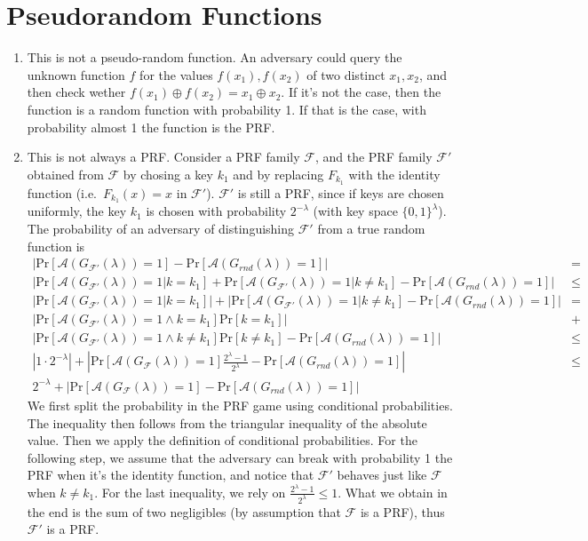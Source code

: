 \documentclass{article}
\newcommand{\adversary}{\mathcal{A}}
\newcommand{\prf}{\mathcal{F}}
\newcommand{\xor}{\oplus}
\renewcommand{\Pr}[1]{\ensuremath{\mathrm{Pr} \left[ {#1} \right]}}
\newcommand{\abs}[1]{\left| {#1} \right|}
\begin{document}
\section{Pseudorandom Functions}

\begin{enumerate}
	\item This is not a pseudo-random function.
		An adversary could query the unknown function $f$ for the values $f(x_1), f(x_2)$ of two distinct $x_1, x_2$, and then check wether $f(x_1) \xor f(x_2) = x_1 \xor x_2$.
		If it's not the case, then the function is a random function with probability 1.
		If that is the case, with probability almost 1 the function is the PRF.
	\item This is not always a PRF.
		Consider a PRF family $\prf$, and the PRF family $\prf'$ obtained from $\prf$ by chosing a key $k_1$ and by replacing $F_{k_1}$ with the identity function (i.e.\ $F_{k_1}(x) = x$ in $\prf'$).
		$\prf'$ is still a PRF, since if keys are chosen uniformly, the key $k_1$ is chosen with probability $2^{-\lambda}$ (with key space $\{0,1\}^{\lambda}$).
		The probability of an adversary of distinguishing $\prf'$ from a true random function is
		\begin{align*}
			\abs{\Pr{\adversary(G_{\prf'}(\lambda)) = 1} - \Pr{\adversary(G_{rnd}(\lambda))=1}} & = \\
			\abs{\Pr{\adversary(G_{\prf'}(\lambda)) = 1 | k = k_1 } + \Pr{\adversary(G_{\prf'}(\lambda)) = 1 | k \neq k_1} - \Pr{\adversary(G_{rnd}(\lambda))=1}} & \le \\
			\abs{\Pr{\adversary(G_{\prf'}(\lambda)) = 1 | k = k_1 }} + \abs{\Pr{\adversary(G_{\prf'}(\lambda)) = 1 | k \neq k_1} - \Pr{\adversary(G_{rnd}(\lambda))=1}} & = \\
			\abs{\Pr{\adversary(G_{\prf'}(\lambda)) = 1 \land k = k_1 } \Pr{k = k_1}} & + \\
			\abs{\Pr{\adversary(G_{\prf'}(\lambda)) = 1 \land k \neq k_1}\Pr{k \neq k_1} - \Pr{\adversary(G_{rnd}(\lambda))=1}} & \le \\
			\abs{1 \cdot 2^{-\lambda}} + \abs{\Pr{\adversary(G_{\prf}(\lambda)) = 1} \frac{2^{\lambda}-1}{2^{\lambda}} - \Pr{\adversary(G_{rnd}(\lambda))=1}} & \le \\
			2^{-\lambda} +
			\abs{\Pr{\adversary(G_{\prf}(\lambda)) = 1} - \Pr{\adversary(G_{rnd}(\lambda))=1}} &
		\end{align*}
		We first split the probability in the PRF game using conditional probabilities.
		The inequality then follows from the triangular inequality of the absolute value.
		Then we apply the definition of conditional probabilities.
		For the following step, we assume that the adversary can break with probability 1 the PRF when it's the identity function, and notice that $\prf'$ behaves just like $\prf$ when $k \neq k_1$.
		For the last inequality, we rely on $\frac{2^{\lambda}-1}{2^{\lambda}} \le 1$.
		What we obtain in the end is the sum of two negligibles (by assumption that $\prf$ is a PRF), thus $\prf'$ is a PRF.


\end{enumerate}
\end{document}
